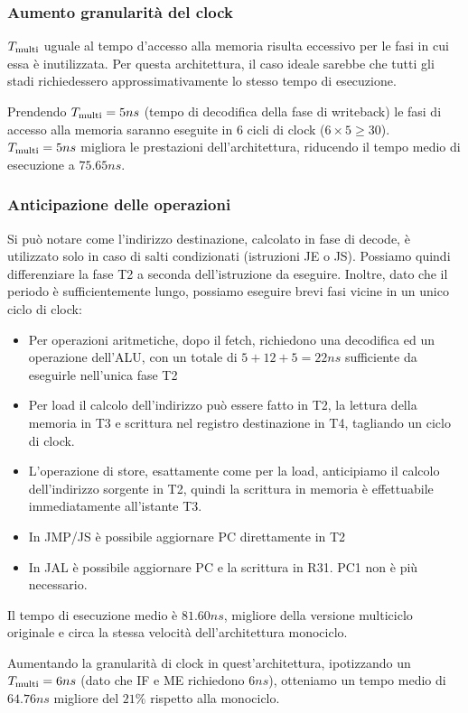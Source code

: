 \documentclass[../ace.tex]{subfiles}
\begin{document}
\subsubsection{Aumento granularità del clock}
$T_\text{multi}$ uguale al tempo d'accesso alla memoria risulta eccessivo per le fasi in cui essa è inutilizzata.
Per questa architettura, il caso ideale sarebbe che tutti gli stadi richiedessero approssimativamente lo stesso tempo di esecuzione.

Prendendo $T_\text{multi} = 5ns$ (tempo di decodifica della fase di writeback) le fasi di accesso alla memoria saranno eseguite in 6 cicli di clock ($6 \times 5 \ge 30$).
$T_\text{multi} = 5ns$ migliora le prestazioni dell'architettura, riducendo il tempo medio di esecuzione a $75.65ns$.

\subsubsection{Anticipazione delle operazioni}
Si può notare come l'indirizzo destinazione, calcolato in fase di decode, è utilizzato solo in caso di salti condizionati (istruzioni JE o JS).
Possiamo quindi differenziare la fase T2 a seconda dell'istruzione da eseguire.
Inoltre, dato che il periodo è sufficientemente lungo, possiamo eseguire brevi fasi vicine in un unico ciclo di clock:

\begin{itemize}
    \item Per operazioni aritmetiche, dopo il fetch, richiedono una decodifica ed un operazione dell'ALU, con un totale
        di $5 + 12 + 5=22ns$ sufficiente da eseguirle nell'unica fase T2
    \item Per load il calcolo dell'indirizzo può essere fatto in T2, la lettura della memoria in T3 e scrittura nel
        registro destinazione in T4, tagliando un ciclo di clock.
    \item L'operazione di store, esattamente come per la load, anticipiamo il calcolo dell'indirizzo sorgente in T2,
        quindi la scrittura in memoria è effettuabile immediatamente all'istante T3.
    \item In JMP/JS è possibile aggiornare PC direttamente in T2
    \item In JAL è possibile aggiornare PC e la scrittura in R31. PC1 non è più necessario.
\end{itemize}

Il tempo di esecuzione medio è $81.60ns$, migliore della versione multiciclo originale e circa la stessa velocità
dell'architettura monociclo.

Aumentando la granularità di clock in quest'architettura, ipotizzando un $T_\text{multi}=6 ns$ (dato che IF e ME richiedono
$6ns$), otteniamo un tempo medio di $64.76ns$ migliore del $21\%$ rispetto alla monociclo.
\end{document}
